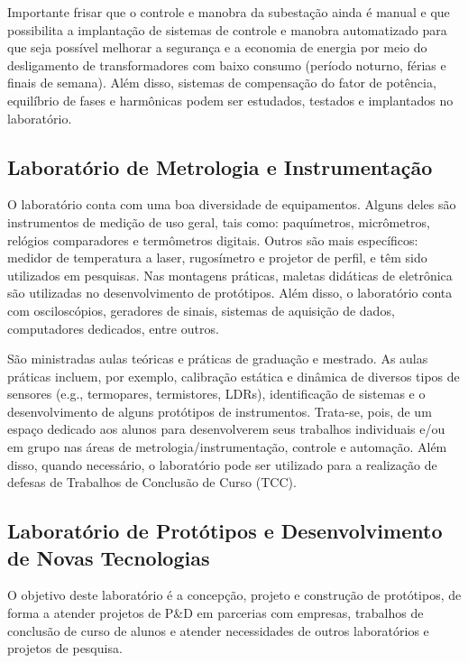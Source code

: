 \documentclass[
	12pt,				%
	openright,			%
	oneside,			%
	a4paper,			%
	english,			%
	brazil				%
	]{abntex2}
\begin{document}
Importante frisar que o controle e manobra da subestação ainda é manual e que possibilita a implantação de sistemas de controle e manobra automatizado para que seja possível melhorar a segurança e a economia de energia por meio do desligamento de transformadores com baixo consumo (período noturno, férias e finais de semana). Além disso, sistemas de compensação do fator de potência, equilíbrio de fases e harmônicas podem ser estudados, testados e implantados no laboratório.

\subsection*{Laboratório de Metrologia e Instrumentação}

O laboratório conta com uma boa diversidade de equipamentos. Alguns deles são instrumentos de medição de uso geral, tais como: paquímetros, micrômetros, relógios comparadores e termômetros digitais. Outros são mais específicos: medidor de temperatura a laser, rugosímetro e projetor de perfil, e têm sido utilizados em pesquisas. Nas montagens práticas, maletas didáticas de eletrônica são utilizadas no desenvolvimento de protótipos. Além disso, o laboratório conta com osciloscópios, geradores de sinais, sistemas de aquisição de dados, computadores dedicados, entre outros.

São ministradas aulas teóricas e práticas de graduação e mestrado. As aulas práticas incluem, por exemplo, calibração estática e dinâmica de diversos tipos de sensores (e.g., termopares, termistores, LDRs), identificação de sistemas e o desenvolvimento de alguns protótipos de instrumentos. Trata-se, pois, de um espaço dedicado aos alunos para desenvolverem seus trabalhos individuais e/ou em grupo nas áreas de metrologia/instrumentação, controle e automação. Além disso, quando necessário, o laboratório pode ser utilizado para a realização de defesas de Trabalhos de Conclusão de Curso (TCC).

\subsection*{Laboratório de Protótipos e Desenvolvimento de Novas Tecnologias}

O objetivo deste laboratório é a concepção, projeto e construção de protótipos, de forma a atender projetos de P\&D em parcerias com empresas, trabalhos de conclusão de curso de alunos e atender necessidades de outros laboratórios e projetos de pesquisa.
\end{document}
